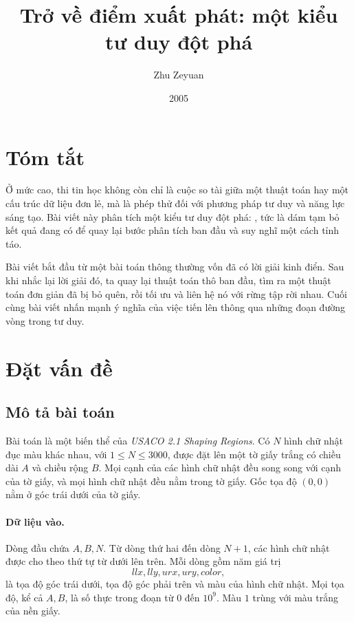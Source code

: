 \documentclass[11pt]{article}
\title{Trở về điểm xuất phát: một kiểu tư duy đột phá}
\author{Zhu Zeyuan}
\date{2005}
\begin{document}
\maketitle


\section*{Tóm tắt}

Ở mức cao, thi tin học không còn chỉ là cuộc so tài giữa một thuật toán hay
một cấu trúc dữ liệu đơn lẻ, mà là phép thử đối với phương pháp tư duy và năng
lực sáng tạo. Bài viết này phân tích một kiểu tư duy đột phá: , tức là dám tạm bỏ kết quả đang có để quay lại bước phân tích
ban đầu và suy nghĩ một cách tỉnh táo.

Bài viết bắt đầu từ một bài toán thông thường vốn đã có lời giải kinh điển.
Sau khi nhắc lại lời giải đó, ta quay lại thuật toán thô ban đầu, tìm ra một
thuật toán đơn giản đã bị bỏ quên, rồi tối ưu và liên hệ nó với rừng tập rời
nhau. Cuối cùng bài viết nhấn mạnh ý nghĩa của việc tiến lên thông qua những
đoạn đường vòng trong tư duy.

\section{Đặt vấn đề}

\subsection{Mô tả bài toán}

Bài toán là một biến thể của \textit{USACO 2.1 Shaping Regions}. Có \(N\)
hình chữ nhật đục màu khác nhau, với \(1\le N\le 3000\), được đặt lên một tờ
giấy trắng có chiều dài \(A\) và chiều rộng \(B\). Mọi cạnh của các hình chữ
nhật đều song song với cạnh của tờ giấy, và mọi hình chữ nhật đều nằm trong
tờ giấy. Gốc tọa độ \((0,0)\) nằm ở góc trái dưới của tờ giấy.

\paragraph{Dữ liệu vào.}
Dòng đầu chứa \(A,B,N\). Từ dòng thứ hai đến dòng \(N+1\), các hình chữ nhật
được cho theo thứ tự từ dưới lên trên. Mỗi dòng gồm năm giá trị
\[
  \mathit{llx},\mathit{lly},\mathit{urx},\mathit{ury},\mathit{color},
\]
là tọa độ góc trái dưới, tọa độ góc phải trên và màu của hình chữ nhật. Mọi
tọa độ, kể cả \(A,B\), là số thực trong đoạn từ \(0\) đến \(10^9\). Màu \(1\)
trùng với màu trắng của nền giấy.
\end{document}
